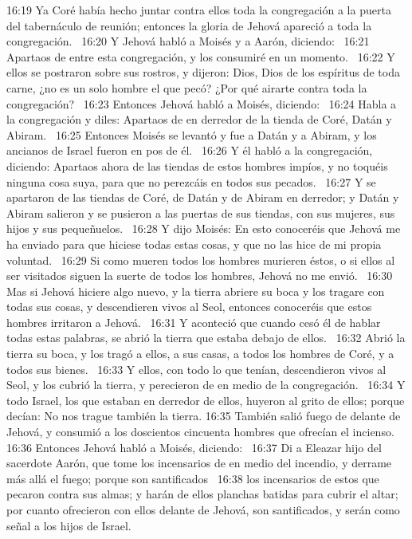 16:19 Ya Coré había hecho juntar contra ellos toda la congregación a la puerta del tabernáculo de reunión; entonces la gloria de Jehová apareció a toda la congregación.  
16:20 Y Jehová habló a Moisés y a Aarón, diciendo:  
16:21 Apartaos de entre esta congregación, y los consumiré en un momento.  
16:22 Y ellos se postraron sobre sus rostros, y dijeron: Dios, Dios de los espíritus de toda carne, ¿no es un solo hombre el que pecó? ¿Por qué airarte contra toda la congregación?  
16:23 Entonces Jehová habló a Moisés, diciendo:  
16:24 Habla a la congregación y diles: Apartaos de en derredor de la tienda de Coré, Datán y Abiram.  
16:25 Entonces Moisés se levantó y fue a Datán y a Abiram, y los ancianos de Israel fueron en pos de él.  
16:26 Y él habló a la congregación, diciendo: Apartaos ahora de las tiendas de estos hombres impíos, y no toquéis ninguna cosa suya, para que no perezcáis en todos sus pecados.  
16:27 Y se apartaron de las tiendas de Coré, de Datán y de Abiram en derredor; y Datán y Abiram salieron y se pusieron a las puertas de sus tiendas, con sus mujeres, sus hijos y sus pequeñuelos.  
16:28 Y dijo Moisés: En esto conoceréis que Jehová me ha enviado para que hiciese todas estas cosas, y que no las hice de mi propia voluntad.  
16:29 Si como mueren todos los hombres murieren éstos, o si ellos al ser visitados siguen la suerte de todos los hombres, Jehová no me envió.  
16:30 Mas si Jehová hiciere algo nuevo, y la tierra abriere su boca y los tragare con todas sus cosas, y descendieren vivos al Seol, entonces conoceréis que estos hombres irritaron a Jehová.  
16:31 Y aconteció que cuando cesó él de hablar todas estas palabras, se abrió la tierra que estaba debajo de ellos.  
16:32 Abrió la tierra su boca, y los tragó a ellos, a sus casas, a todos los hombres de Coré, y a todos sus bienes.  
16:33 Y ellos, con todo lo que tenían, descendieron vivos al Seol, y los cubrió la tierra, y perecieron de en medio de la congregación.  
16:34 Y todo Israel, los que estaban en derredor de ellos, huyeron al grito de ellos; porque decían: No nos trague también la tierra. 
16:35 También salió fuego de delante de Jehová, y consumió a los doscientos cincuenta hombres que ofrecían el incienso.  
16:36 Entonces Jehová habló a Moisés, diciendo:  
16:37 Di a Eleazar hijo del sacerdote Aarón, que tome los incensarios de en medio del incendio, y derrame más allá el fuego; porque son santificados  
16:38 los incensarios de estos que pecaron contra sus almas; y harán de ellos planchas batidas para cubrir el altar; por cuanto ofrecieron con ellos delante de Jehová, son santificados, y serán como señal a los hijos de Israel.  

